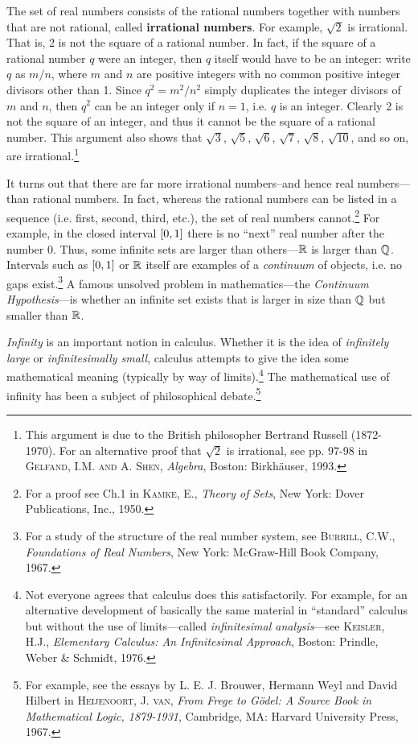 The set of real numbers consists of the rational numbers together with numbers
that are not rational, called \textbf{irrational numbers}. For example, $\sqrt{2}$ is irrational. That is, 2 is not the square of
a rational number. In fact, if the square of a rational number $q$ were an
integer, then $q$ itself would have to be an integer: write $q$ as $m/n$, where
$m$ and $n$ are positive integers with no common positive integer divisors other
than 1. Since $q^2 = m^2/n^2$ simply duplicates the integer divisors of $m$ and
$n$, then $q^2$ can be an integer only if $n=1$, i.e. $q$ is an integer. Clearly
2 is not the square of an integer, and thus it cannot be the square of a
rational number. This argument also shows that $\sqrt{3}$, $\sqrt{5}$,
$\sqrt{6}$, $\sqrt{7}$, $\sqrt{8}$, $\sqrt{10}$, and so on, are
irrational.\footnote{This argument is due to the British philosopher Bertrand
Russell (1872-1970). For an alternative proof that $\sqrt{2}$ is irrational, see
pp. 97-98 in \textsc{Gelfand, I.M. and A. Shen}, \emph{Algebra}, Boston:
Birkh\"{a}user, 1993.}

It turns out that there are far more irrational numbers--and hence real
numbers---than rational numbers. In fact, whereas the rational numbers can be
listed in a sequence (i.e. first, second, third, etc.), the set of real numbers
cannot.\footnote{For a proof see Ch.1 in \textsc{Kamke, E.}, \emph{Theory of
Sets}, New York: Dover Publications, Inc., 1950.} For example, in the closed
interval $\lbrack 0,1 \rbrack$ there is no ``next'' real number after the number $0$.
Thus, some infinite sets are larger than others---$\mathbb{R}$ is larger than
$\mathbb{Q}$. Intervals such as $\lbrack 0,1 \rbrack$
or $\mathbb{R}$ itself are examples of a \emph{continuum} of objects, i.e. no
gaps exist.\footnote{For a study of the structure of the real number system, see
\textsc{Burrill, C.W.}, \emph{Foundations of Real Numbers}, New York:
McGraw-Hill Book Company, 1967.}
A famous unsolved problem in mathematics---the \emph{Continuum Hypothesis}---is
whether an infinite set exists that is larger in size than $\mathbb{Q}$ but
smaller than $\mathbb{R}$.

\emph{Infinity} is an important notion in calculus. Whether it is the idea
of \emph{infinitely large} or \emph{infinitesimally small}, calculus attempts to
give the idea some mathematical meaning (typically by way of
limits).\footnote{Not everyone agrees that calculus does this satisfactorily.
For example, for an alternative development of basically the same material
in ``standard'' calculus but without the use of limits---called
\emph{infinitesimal analysis}---see \textsc{Keisler, H.J.}, \emph{Elementary
Calculus: An Infinitesimal Approach}, Boston: Prindle, Weber \& Schmidt, 1976.}
The mathematical use of infinity has been a subject of philosophical
debate.\footnote{For example, see the essays by L. E. J. Brouwer, Hermann
Weyl and David Hilbert in \textsc{Heijenoort, J. van}, \emph{From Frege to
G{\"o}del: A Source Book in Mathematical Logic, 1879-1931}, Cambridge, MA:
Harvard University Press, 1967.}

